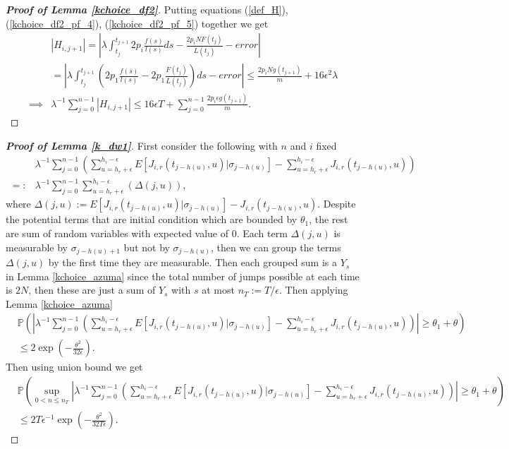 \documentclass[12pt]{article}
\def\P{\mathbb{P}}
\numberwithin{equation}{section}  %
\begin{document}
\begin{proof}[\textbf{Proof of Lemma \ref{kchoice_df2}}]
Putting equations (\ref{def_H}), (\ref{kchoice_df2_pf_4}), (\ref{kchoice_df2_pf_5}) together we get
\begin{align*} 
&|H_{i,j+1}|=\left|\lambda\int_{t_j}^{t_{j+1}} 2p_i\frac{f(s)}{l(s)}ds-\frac{2p_iNF(t_j)}{L(t_j)}-error\right|\\
&=\left|\lambda\int_{t_j}^{t_{j+1}}\left( 2p_1\frac{f(s)}{l(s)}-2p_1\frac{F(t_j)}{L(t_j)}\right)ds-error\right|\leq \frac{2p_iNg(t_{j+1})}{m}+16\epsilon^2\lambda\\
\implies&\lambda^{-1}\sum_{j=0}^{n-1}|H_{i,j+1}|\leq  16\epsilon T+\sum_{j=0}^{n-1} \frac{2p_i\epsilon g(t_{j+1})}{m}.
\end{align*} 
\end{proof}

\begin{proof}[\textbf{Proof of Lemma \ref{k_dw1}}]
First consider the following with $n$ and $i$ fixed
\begin{align*} 
&\lambda^{-1}\sum_{j=0}^{n-1}\left(
\sum_{u=h_r+\epsilon}^{h_i-\epsilon}E[J_{i,r}(t_{j-h(u)},u)|\sigma_{j-h(u)}]
-\sum_{u=h_r+\epsilon}^{h_i-\epsilon}J_{i,r}(t_{j-h(u)},u)
\right)\\
=:&\lambda^{-1}\sum_{j=0}^{n-1}\sum_{u=h_r+\epsilon}^{h_i-\epsilon}\left(\Delta(j,u)\right),
\end{align*}
where $\Delta(j,u):=E[J_{i,r}(t_{j-h(u)},u)|\sigma_{j-h(u)}]
-J_{i,r}(t_{j-h(u)},u)$. Despite the potential terms that are initial condition which are bounded by $\theta_1$, the rest are sum of random variables with expected value of $0$. Each term $\Delta(j,u)$ is measurable by $\sigma_{j-h(u)+1}$ but not by $\sigma_{j-h(u)}$, then we can group the terms $\Delta(j,u)$ by the first time they are measurable. Then each grouped sum is a $Y_s$ in Lemma \ref{kchoice_azuma} since the total number of jumps possible at each time is $2N$, then these are just a sum of $Y_s$ with $s$ at most $n_T:=T/\epsilon$. Then applying Lemma \ref{kchoice_azuma}
\begin{align*} 
&\P\left(
\left|
\lambda^{-1}\sum_{j=0}^{n-1}\left(
\sum_{u=h_r+\epsilon}^{h_i-\epsilon}E[J_{i,r}(t_{j-h(u)},u)|\sigma_{j-h(u)}]
-\sum_{u=h_r+\epsilon}^{h_i-\epsilon}J_{i,r}(t_{j-h(u)},u)
\right)
\right|
\geq \theta_1+\theta
\right)\\
&\leq 2\exp\left(-\frac{\theta^2}{32\epsilon}\right).
\end{align*} 
Then using union bound we get 
{\small
\begin{align*} 
&\P\left(
\sup_{0<n\leq n_T}\left|\lambda^{-1}\sum_{j=0}^{n-1}\left(
\sum_{u=h_r+\epsilon}^{h_i-\epsilon}E[J_{i,r}(t_{j-h(u)},u)|\sigma_{j-h(u)}]
-\sum_{u=h_r+\epsilon}^{h_i-\epsilon}J_{i,r}(t_{j-h(u)},u)
\right)
\right|
\geq\theta_1+\theta
\right)\\
&\leq 2T\epsilon^{-1}\exp\left(-\frac{\theta^2}{32T\epsilon}\right).
\end{align*}}
\end{proof}
\end{document}
